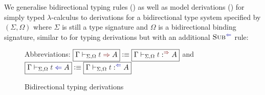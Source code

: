 We generalise bidirectional typing rules () as well as model derivations () for simply typed $\lambda$-calculus to derivations for a bidirectional type system specified by $(\Sigma, \Omega)$ where $\Sigma$ is still a type signature and $\Omega$ is a bidirectional binding signature, similar to  for typing derivations but with an additional $\ChkRule{Sub}$ rule:
\begin{definition}\label{def:bidirectional-typing-derivations}\label{def:mode-derivations}
  \begin{figure}
    \centering
    \small
    Abbreviations: $\boxed{\Gamma \vdash_{\Sigma, \Omega} \isTerm{t} \syn A} \defeq \boxed{\Gamma \vdash_{\Sigma, \Omega} \isTerm{t} :^{\syn} A}$ and $\boxed{\Gamma \vdash_{\Sigma, \Omega} \isTerm{t} \chk A} \defeq \boxed{\Gamma \vdash_{\Sigma, \Omega} \isTerm{t} :^{\chk} A}$
    \caption{Bidirectional typing derivations}
    \label{fig:bidirectional-typing-derivations}
  \end{figure}
  \begin{figure}
    \centering
    \small

\end{figure}
\end{definition}
